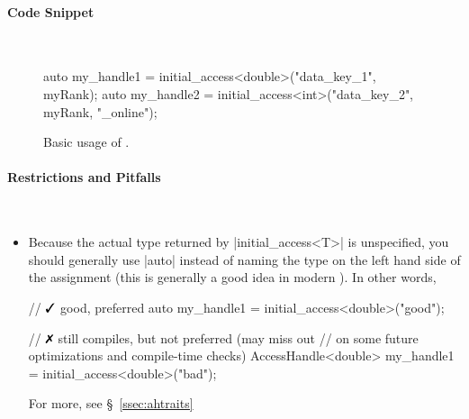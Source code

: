 \paragraph{Code Snippet}\mbox{}\\
\begin{figure}[!h]
\begin{CppCodeNumb}
  auto my_handle1 = initial_access<double>("data_key_1", myRank);
  auto my_handle2 = initial_access<int>("data_key_2", myRank, "_online");
\end{CppCodeNumb}
\label{fig:fe_api_initialaccess}
\caption{Basic usage of \protect{}.}
\end{figure}

\paragraph{Restrictions and Pitfalls}\mbox{}\\ 
\begin{itemize}
  \item Because the actual type returned by |initial_access<T>| is
  unspecified, you should generally use |auto| instead of naming the type on 
  the left hand side of the assignment (this is generally a good idea in modern
  \CC{}). In other words,
  \begin{CppCode}
	// $\yes$ good, preferred
	auto my_handle1 = initial_access<double>("good"); 

	// $\no$ still compiles, but not preferred (may miss out
	//  on some future optimizations and compile-time checks)
	AccessHandle<double> my_handle1 = initial_access<double>("bad"); 
  \end{CppCode}
  For more, see \S~\ref{ssec:ahtraits}
\end{itemize}



